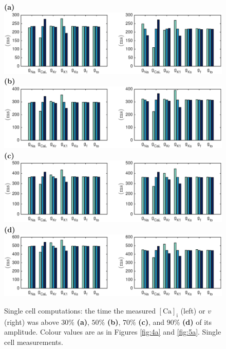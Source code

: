 \documentclass{article}
\begin{document}
\begin{figure}
 \textbf{(a)}  \includegraphics[trim=1cm 0cm 2cm 0cm, clip=true, width=1\linewidth]{sc_30p} 
 \textbf{(b)}  \includegraphics[trim=1cm 0cm 2cm 0cm, clip=true, width=1\linewidth]{sc_50p} 
 \textbf{(c)}   \includegraphics[trim=1cm 0cm 2cm 0cm, clip=true, width=1\linewidth]{sc_70p} 
  \textbf{(d)}   \includegraphics[trim=1cm 0cm 2cm 0cm, clip=true, width=1\linewidth]{sc_90p} 
    \caption{Single cell computations: the time the measured $[\mathrm{Ca}]_{\mathrm{i}}$ (left) or $v$ (right) was above $30\%$ \textbf{(a)}, $50\%$ \textbf{(b)}, $70\%$ \textbf{(c)}, and $90\%$ \textbf{(d)} of its amplitude. Colour values are as in Figures \ref{fig:4a} and \ref{fig:5a}. Single cell measurements.}
    \label{fig:7a}
\end{figure}
\end{document}
